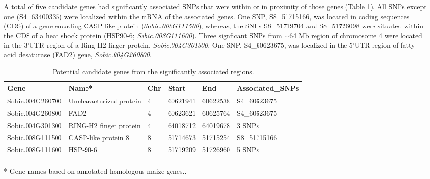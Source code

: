 \documentclass[10pt,letterpaper]{article}
\begin{document}
A total of five candidate genes had significantly associated SNPs that were within or in proximity of those genes (Table \ref{tab1}). All SNPs except one (S4\_63400335) were localized within the mRNA of the associated genes. One SNP, S8\_51715166, was located in coding sequences (CDS) of a gene encoding CASP like protein (\textit{Sobic.008G111500}), whereas, the SNPs S8\_51719704 and S8\_51726098 were situated within the CDS of a heat shock protein (HSP90-6; \textit{Sobic.008G111600}). Three signficant SNPs from $\sim$64 Mb region of chromosome 4 were located in the 3'UTR region of a Ring-H2 finger protein, \textit{Sobic.004G301300}. One SNP, S4\_60623675, was localized in the 5'UTR region of fatty acid desaturase (FAD2) gene, \textit{Sobic.004G260800}.

\begin{table}
\caption{Potential candidate genes from the significantly associated regions.}
\begin{tabular}{llllll}
\hline
Gene & Name{*} & Chr & Start & End & Associated\_SNPs \\ \hline
Sobic.004G260700 & Uncharacterized protein & 4 & 60621941 & 60622538 & S4\_60623675 \\ 
Sobic.004G260800 & FAD2 & 4 & 60623621 & 60625764 & S4\_60623675 \\ 
Sobic.004G301300 & RING-H2 finger protein & 4 & 64018712 & 64019678 & 3 SNPs\\
Sobic.008G111500 & CASP-like protein 8 & 8 & 51714673 & 51715254 & S8\_51715166 \\
Sobic.008G111600 & HSP-90-6 & 8 & 51719209 & 51726960 & 5 SNPs \\ \hline
\label{tab1}
\end{tabular}
\vspace{-0.5cm}
   \item[*]{Gene names based on annotated homologous maize genes.}.  
\end{table}
\end{document}
